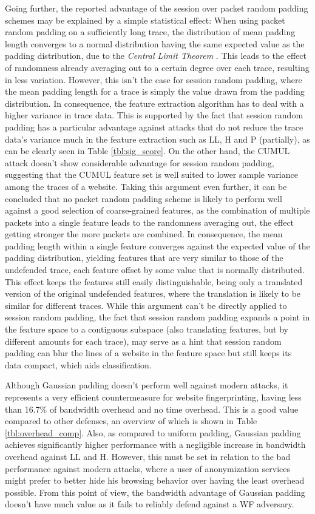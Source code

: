 \documentclass[
	ruledheaders=chapter,
	class=report,
	thesis={type=master, department=inf},
	accentcolor=1c,
	custommargins=true,
	marginpar=false,
	parskip=half-,
	fontsize=11pt,
]{tudapub}
\begin{document}
	Going further, the reported advantage of the session over packet random padding schemes may be explained by a simple statistical effect: When using packet random padding on a sufficiently long trace, the distribution of mean padding length converges to a normal distribution having the same expected value as the padding distribution, due to the \textit{Central Limit Theorem} \cite{Fischer2010}. This leads to the effect of randomness already averaging out to a certain degree over each trace, resulting in less variation. However, this isn't the case for session random padding, where the mean padding length for a trace is simply the value drawn from the padding distribution. In consequence, the feature extraction algorithm has to deal with a higher variance in trace data. This is supported by the fact that session random padding has a particular advantage against attacks that do not reduce the trace data's variance much in the feature extraction such as LL, H and P (partially), as can be clearly seen in Table \ref{tbl:sig_score}. On the other hand, the CUMUL attack doesn't show considerable advantage for session random padding, suggesting that the CUMUL feature set is well suited to lower sample variance among the traces of a website. Taking this argument even further, it can be concluded that no packet random padding scheme is likely to perform well against a good selection of coarse-grained features, as the combination of multiple packets into a single feature leads to the randomness averaging out, the effect getting stronger the more packets are combined. In consequence, the mean padding length within a single feature converges against the expected value of the padding distribution, yielding features that are very similar to those of the undefended trace, each feature offset by some value that is normally distributed. This effect keeps the features still easily distinguishable, being only a translated version of the original undefended features, where the translation is likely to be similar for different traces. While this argument can't be directly applied to session random padding, the fact that session random padding expands a point in the feature space to a contiguous subspace (also translating features, but by different amounts for each trace), may serve as a hint that session random padding can blur the lines of a website in the feature space but still keeps its data compact, which aids classification.
	
	Although Gaussian padding doesn't perform well against modern attacks, it represents a very efficient countermeasure for website fingerprinting, having less than 16.7\% of bandwidth overhead and no time overhead. This is a good value compared to other defenses, an overview of which is shown in Table \ref{tbl:overhead_comp}. Also, as compared to uniform padding, Gaussian padding achieves significantly higher performance with a negligible increase in bandwidth overhead against LL and H. However, this must  be set in relation to the bad performance against modern attacks, where a user of anonymization services might prefer to better hide his browsing behavior over having the least overhead possible. From this point of view, the bandwidth advantage of Gaussian padding doesn't have much value as it fails to reliably defend against a WF adversary.
	
\end{document}
